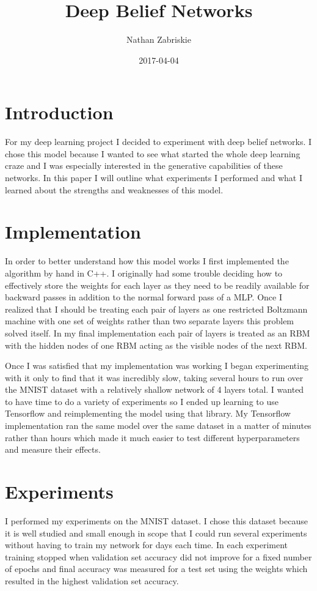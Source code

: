 \documentclass{article}
\title{Deep Belief Networks}
\date{2017-04-04}
\author{Nathan Zabriskie}
\begin{document}
	
	\maketitle
	
	\section{Introduction}
	For my deep learning project I decided to experiment with deep belief networks. I chose this model because I wanted to see what started the whole deep learning craze and I was especially interested in the generative capabilities of these networks. In this paper I will outline what experiments I performed and what I learned about the strengths and weaknesses of this model.
	
	\section{Implementation}
	In order to better understand how this model works I first implemented the algorithm by hand in C++. I originally had some trouble deciding how to effectively store the weights for each layer as they need to be readily available for backward passes in addition to the normal forward pass of a MLP. Once I realized that I should be treating each pair of layers as one restricted Boltzmann machine with one set of weights rather than two separate layers this problem solved itself. In my final implementation each pair of layers is treated as an RBM with the hidden nodes of one RBM acting as the visible nodes of the next RBM.
	
	 Once I was satisfied that my implementation was working I began experimenting with it only to find that it was incredibly slow, taking several hours to run over the MNIST dataset with a relatively shallow network of 4 layers total. I wanted to have time to do a variety of experiments so I ended up learning to use Tensorflow and reimplementing the model using that library. My Tensorflow implementation ran the same model over the same dataset in a matter of minutes rather than hours which made it much easier to test different hyperparameters and measure their effects. 
	
	\section{Experiments}
	I performed my experiments on the MNIST dataset. I chose this dataset because it is well studied and small enough in scope that I could run several experiments without having to train my network for days each time. In each experiment training stopped when validation set accuracy did not improve for a fixed number of epochs and final accuracy was measured for a test set using the weights which resulted in the highest validation set accuracy.
	
\end{document}
